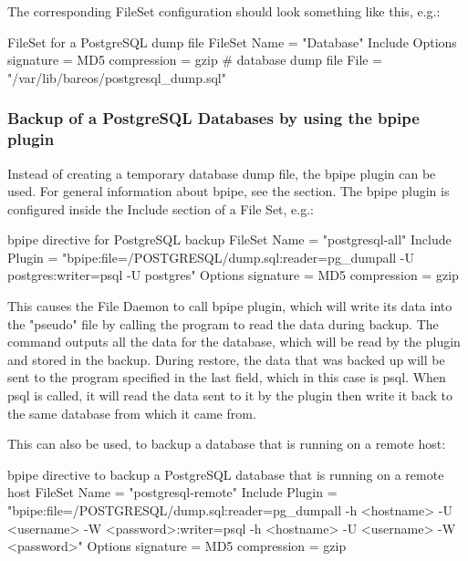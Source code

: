 The corresponding FileSet configuration should look something like this, e.g.:
\begin{bconfig}{FileSet for a PostgreSQL dump file}
FileSet {
  Name = "Database"
  Include {
    Options {
      signature = MD5
      compression = gzip
    }
    # database dump file
    File = "/var/lib/bareos/postgresql_dump.sql"
  }
}
\end{bconfig}

\subsubsection{Backup of a PostgreSQL Databases by using the bpipe plugin}

Instead of creating a temporary database dump file,
the bpipe plugin can be used. 
For general information about bpipe, see the  section. 
The bpipe plugin is configured inside the Include section of a File Set, e.g.:
\begin{bconfig}{bpipe directive for PostgreSQL backup}
FileSet {
  Name = "postgresql-all"
  Include {
    Plugin = "bpipe:file=/POSTGRESQL/dump.sql:reader=pg_dumpall -U postgres:writer=psql -U postgres"
    Options {
      signature = MD5
      compression = gzip
    }
  }
}
\end{bconfig}

This causes the File Daemon to call bpipe plugin, which will write its data into the "pseudo" file  by
calling the program  to read the data during backup. The  command outputs all 
the data for the database, which will be read by the plugin and stored in the backup. During restore, the data that was backed up will
be sent to the program specified in the last field, which in this case is psql. When psql is called, it will read the data sent to it by 
the plugin then write it back to the same database from which it came from.

This can also be used, to backup a database that is running on a remote host:
\begin{bconfig}{bpipe directive to backup a PostgreSQL database that is running on a remote host}
FileSet {
  Name = "postgresql-remote"
  Include {
    Plugin = "bpipe:file=/POSTGRESQL/dump.sql:reader=pg_dumpall -h <hostname> -U <username> -W <password>:writer=psql -h <hostname> -U <username> -W <password>"
    Options {
      signature = MD5
      compression = gzip
    }
  }
}
\end{bconfig}

